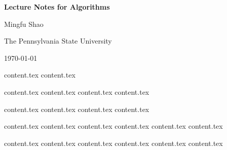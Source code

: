 \documentclass[letterpaper,11pt]{article}
\theoremstyle{mytheorem}
\begin{document}

\thispagestyle{titlestyle}
\begin{center}
\vspace*{4cm} {\huge \bf Lecture Notes for Algorithms } \vspace*{2cm}

{\large  Mingfu Shao}

{\large  The Pennsylvania State University}

{\large  \today}
\end{center}

\clearpage \newpage


\makeatletter
\renewcommand{\l@section}{\@dottedtocline{1}{0em}{5em}}
\makeatother

\thispagestyle{tablestyle}
\tableofcontents \thispagestyle{tablestyle} \clearpage \newpage

{content.tex} \clearpage\newpage
{content.tex} \clearpage\newpage

{content.tex} \clearpage\newpage
{content.tex} \clearpage\newpage
{content.tex} \clearpage\newpage
{content.tex} \clearpage\newpage

{content.tex} \clearpage\newpage
{content.tex} \clearpage\newpage
{content.tex} \clearpage\newpage
{content.tex} \clearpage\newpage

{content.tex} \clearpage\newpage
{content.tex} \clearpage\newpage
{content.tex} \clearpage\newpage
{content.tex} \clearpage\newpage
{content.tex} \clearpage\newpage
{content.tex} \clearpage\newpage

{content.tex} \clearpage\newpage
{content.tex} \clearpage\newpage
{content.tex} \clearpage\newpage
{content.tex} \clearpage\newpage
{content.tex} \clearpage\newpage
{content.tex} \clearpage\newpage
\end{document}

